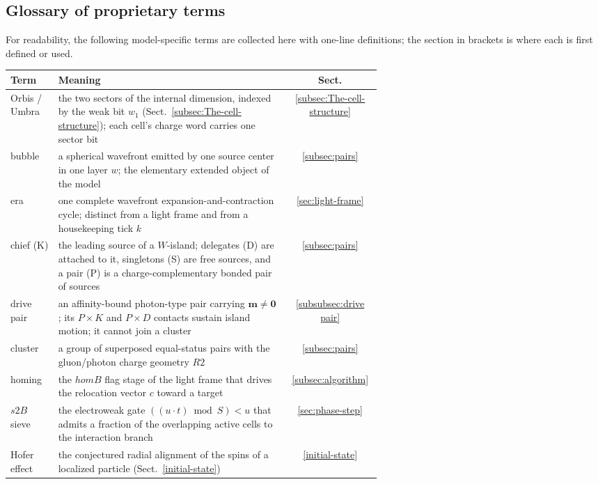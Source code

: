\documentclass[a4paper]{article}
\begin{document}
\subsection*{Glossary of proprietary terms}
For readability, the following model-specific terms are collected here with one-line definitions; the section in brackets is where each is first defined or used.
\begin{center}
\begin{tabular}{|l|p{0.62\linewidth}|c|}
\hline
\textbf{Term} & \textbf{Meaning} & \textbf{Sect.}\\
\hline
Orbis / Umbra & the two sectors of the internal dimension, indexed by the weak bit $w_1$ (Sect.~\ref{subsec:The-cell-structure}); each cell's charge word carries one sector bit & \ref{subsec:The-cell-structure}\\
\hline
bubble & a spherical wavefront emitted by one source center in one layer $w$; the elementary extended object of the model & \ref{subsec:pairs}\\
\hline
era & one complete wavefront expansion-and-contraction cycle; distinct from a light frame and from a housekeeping tick $k$ & \ref{sec:light-frame}\\
\hline
chief (K) & the leading source of a $W$-island; delegates (D) are attached to it, singletons (S) are free sources, and a pair (P) is a charge-complementary bonded pair of sources & \ref{subsec:pairs}\\
\hline
drive pair & an affinity-bound photon-type pair carrying $\boldsymbol{m}\ne\mathbf{0}$; its $P\times K$ and $P\times D$ contacts sustain island motion; it cannot join a cluster & \ref{subsubsec:drive pair}\\
\hline
cluster & a group of superposed equal-status pairs with the gluon/photon charge geometry $R2$ & \ref{subsec:pairs}\\
\hline
homing & the $homB$ flag stage of the light frame that drives the relocation vector $c$ toward a target & \ref{subsec:algorithm}\\
\hline
$s2B$ sieve & the electroweak gate $((u\cdot t)\bmod S)<u$ that admits a fraction of the overlapping active cells to the interaction branch & \ref{sec:phase-step}\\
\hline
Hofer effect & the conjectured radial alignment of the spins of a localized particle (Sect.~\ref{initial-state}) & \ref{initial-state}\\
\hline
\end{tabular}
\end{center}
\end{document}
